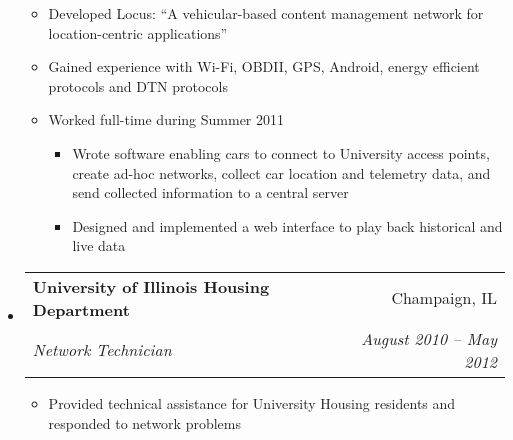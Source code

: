 \documentclass[letterpaper,11pt]{article}
\makeatletter
\newcommand{\resitem}[1]{\item #1 \vspace{-2pt}}
\newcommand{\resheading}[1]{{\large \colorbox{mygrey}{\begin{minipage}{\textwidth}{\textbf{#1 \vphantom{p\^{E}}}}\end{minipage}}}}
\newcommand{\ressubheading}[4]{
\begin{tabular*}{7.0in}{l@{\extracolsep{\fill}}r}
		\textbf{#1} & #2 \\
		\textit{#3} & \textit{#4} \\
\end{tabular*}\vspace{-6pt}}
\newcommand{\resoneheadingit}[2]{
\begin{tabular*}{7.0in}{l@{\extracolsep{\fill}}r}
		\textbf{#1} & \textit{#2} \\
\end{tabular*}\vspace{-6pt}}
\makeatother
\begin{document}
\begin{itemize}
	\begin{itemize}
		\resitem{Developed Locus: ``A vehicular-based content management network for location-centric applications''}
		\resitem{Gained experience with Wi-Fi, OBDII, GPS, Android, energy efficient protocols and DTN protocols}
		\resitem{Worked full-time during Summer 2011}
		\begin{itemize}
			\resitem{Wrote software enabling cars to connect to University access points, create ad-hoc networks,
			 collect car location and telemetry data, and send collected information to a central server}
			\resitem{Designed and implemented a web interface to play back historical and live data}
		\end{itemize}
	\end{itemize}
\item
	\ressubheading{University of Illinois Housing Department}{Champaign, IL}{Network Technician}{August 2010 -- May 2012}
	\begin{itemize}
		\resitem{Provided technical assistance for University Housing residents and responded to network problems}
	\end{itemize}

\end{itemize}
%
\end{document}
